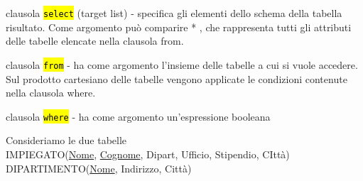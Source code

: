 \documentclass[a4paper]{article}
\begin{document}
clausola \hl{\texttt{select}} (target list) - specifica gli elementi dello schema della tabella risultato. Come argomento può comparire * , che rappresenta tutti gli attributi delle tabelle elencate nella clausola from.\medskip\\\par clausola \hl{\texttt{from}} - ha come argomento l’insieme delle tabelle a cui si vuole accedere. Sul prodotto cartesiano delle tabelle vengono applicate le condizioni contenute nella clausola where.\medskip\\\par clausola \hl{\texttt{where}} - ha come argomento un’espressione booleana\medskip\medskip\medskip\\\par Consideriamo le due tabelle\\
IMPIEGATO(\underline{Nome}, \underline{Cognome}, Dipart, Ufficio, Stipendio, CIttà)\\
DIPARTIMENTO(\underline{Nome}, Indirizzo, Città)
\end{document}
